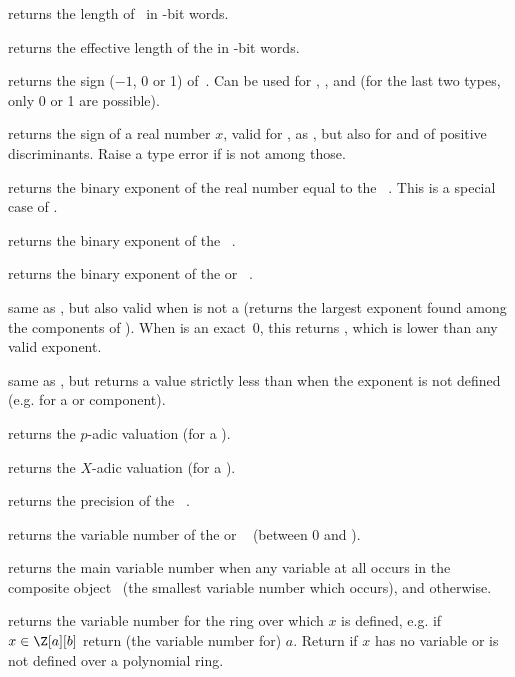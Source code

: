  returns the length of~ in \B-bit words.

 returns the effective length of the 
 in \B-bit words.

 returns the sign ($-1$, 0 or 1) of~. Can be
used for , ,  and  (for the last two
types, only 0 or 1 are possible).

 returns the sign of a real number $x$,
valid for ,  as , but also for 
and  of positive discriminants. Raise a type error if 
is not among those.

 returns the binary exponent of the real number equal
to the ~. This is a special case of .

 returns the binary exponent of the
~.

 returns the binary exponent of the 
or ~.

 same as , but also valid when 
is not a  (returns the largest exponent found among the components
of ). When  is an exact~0, this returns
\hbox{}, which is lower than any valid exponent.

 same as , but returns a value
strictly less than \hbox{} when the exponent is not defined
(e.g. for a  or  component).

 returns the $p$-adic valuation (for
a ).

 returns the $X$-adic valuation (for a ).

 returns the precision of the ~.

 returns the variable number of the
 or ~ (between 0 and ).

 returns the main variable number when any variable
at all occurs in the composite object~ (the smallest variable number
which occurs), and  otherwise.

 returns the variable number for the ring over which
$x$ is defined, e.g. if $x\in \Z[a][b]$ return (the variable number for)
$a$. Return  if $x$ has no variable or is not defined over a
polynomial ring.

